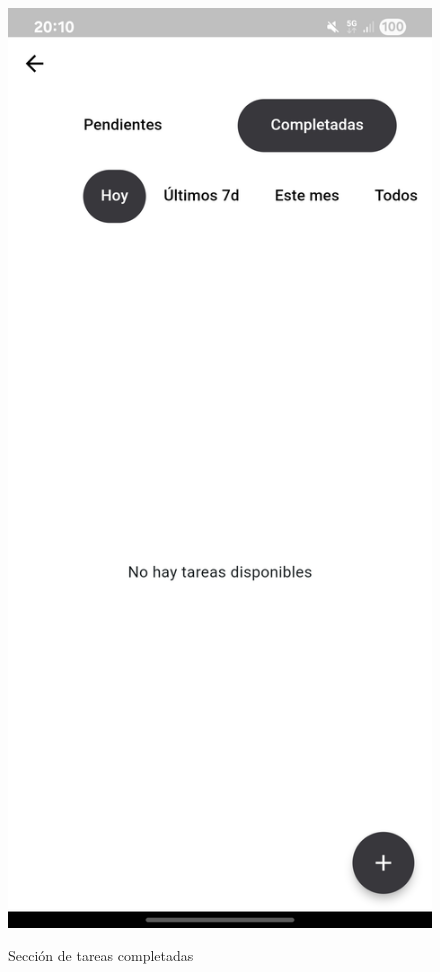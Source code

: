 \begin{figure}[H]
\begin{floatrow}
     {\includegraphics[width=0.5\linewidth]{img/tareas_personales_completadas.jpg}}
     {\caption{Sección de tareas completadas}
     \label{fig:tareas_personales_completadas}}
  \end{floatrow}
\end{figure}

